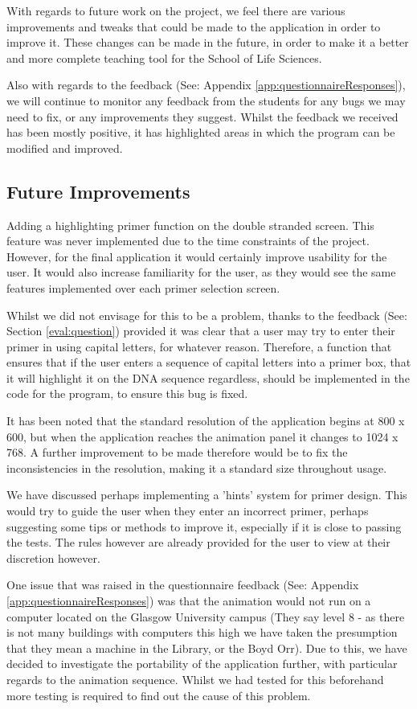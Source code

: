 With regards to future work on the project, we feel there are various improvements and tweaks that could be made to the application in order to improve it. These changes can be made in the future, in order to make it a better and more complete teaching tool for the School of Life Sciences.

Also with regards to the feedback (See: Appendix \ref{app:questionnaireResponses}), we will continue to monitor any feedback from the students for any bugs we may need to fix, or any improvements they suggest. Whilst the feedback we received has been mostly positive, it has highlighted areas in which the program can be modified and improved.

\subsection{Future Improvements}

Adding a highlighting primer function on the double stranded screen. This feature was never implemented due to the time constraints of the project. However, for the final application it would certainly improve usability for the user. It would also increase familiarity for the user, as they would see the same features implemented over each primer selection screen.

Whilst we did not envisage for this to be a problem, thanks to the feedback (See: Section \ref{eval:question}) provided it was clear that a user may try to enter their primer in using capital letters, for whatever reason. Therefore, a function that ensures that if the user enters a sequence of capital letters into a primer box, that it will highlight it on the DNA sequence regardless, should be implemented in the code for the program, to ensure this bug is fixed.

It has been noted that the standard resolution of the application begins at 800 x 600, but when the application reaches the animation panel it changes to 1024 x 768. A further improvement to be made therefore would be to fix the inconsistencies in the resolution, making it a standard size throughout usage.

We have discussed perhaps implementing a 'hints' system for primer design. This would try to guide the user when they enter an incorrect primer, perhaps suggesting some tips or methods to improve it, especially if it is close to passing the tests. The rules however are already provided for the user to view at their discretion however.

One issue that was raised in the questionnaire feedback (See: Appendix \ref{app:questionnaireResponses}) was that the animation would not run on a computer located on the Glasgow University campus (They say level 8 - as there is not many buildings with computers this high we have taken the presumption that they mean a machine in the Library, or the Boyd Orr). Due to this, we have decided to investigate the portability of the application further, with particular regards to the animation sequence. Whilst we had tested for this beforehand more testing is required to find out the cause of this problem.

